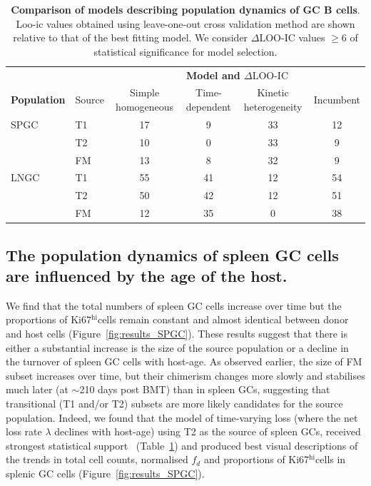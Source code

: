 \documentclass[11pt,onecolumn]{article}
\newcommand{\khi}{Ki67$^\text{hi}$}
\newcommand{\looic}{\ensuremath{\Delta \text{LOO-IC}}}
\begin{document}
	
	\begin{table}[h!]
		\begin{center}
			\renewcommand{\arraystretch}{1.25}
			\begin{tabular}{l l c c c c} 
				\toprule 
				&         & \multicolumn{4}{c}{\textbf{Model and {\looic}}} \\
				\cline{3-6}
				\textbf{Population} & Source     & {\small Simple homogeneous}&  {\small Time-dependent}    & {\small Kinetic heterogeneity} & {\small Incumbent} \\ 
				\toprule
				SPGC &   T1    &   17           &          9            &           33         &          12        \\ 
				     &   T2    &   10           &          0            &           33         &          9         \\ 
				     &   FM    &   13           &          8            &           32         &          9         \\ 
				\hline
				LNGC &   T1    &   55           &          41           &           12         &          54        \\ 
				     &   T2    &   50           &          42           &           12         &          51        \\ 
				     &   FM    &   12           &          35           &           0          &          38        \\ 
				\hline
				\toprule 
			\end{tabular}
		\end{center}
		\caption{\small \textbf{Comparison of models describing population dynamics of GC B cells}. Loo-ic values obtained using leave-one-out cross validation method are shown relative to that of the best fitting model. We consider {\looic} values $\ge$6 of statistical significance for model selection.} 
		\label{tab:GC-AICs}
	\end{table} 
	
	\subsection*{The population dynamics of spleen GC cells are influenced by the age of the host.}
	We find that the total numbers of spleen GC cells increase over time but the proportions of \khi cells remain constant and almost identical between donor and host cells (Figure~\ref{fig:results_SPGC}).
	These results suggest that there is either a substantial increase is the size of the source population or a decline in the turnover of spleen GC cells with host-age.  
	As observed earlier, the size of FM subset increases over time, but their chimerism changes more slowly and stabilises much later (at $\sim$210 days post BMT) than in spleen GCs, suggesting that transitional (T1 and/or T2) subsets are more likely candidates for the source population. 
	Indeed, we found that the model of time-varying loss (where the net loss rate $\lambda$ declines with host-age) using T2 as the source of spleen GCs, received strongest statistical support ~(Table~\ref{tab:GC-AICs}) and produced best visual descriptions of the trends in total cell counts, normalised $f_{d}$ and proportions of \khi cells in splenic GC cells (Figure~\ref{fig:results_SPGC}). 
	
\end{document}
